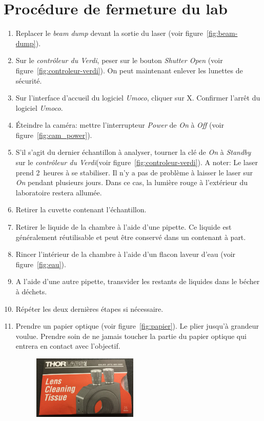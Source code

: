 \section{Procédure de fermeture du lab}


\begin{enumerate}
    \item Replacer le \textit{beam dump} devant la sortie du laser (voir figure~\ref{fig:beam-dump}).
    \item Sur le \textit{contrôleur du Verdi}, peser sur le bouton \textit{Shutter Open} (voir figure~\ref{fig:controleur-verdi}). On peut maintenant enlever les lunettes de sécurité.
    \item Sur l'interface d'accueil du logiciel \textit{Umoco}, cliquer sur X. Confirmer l'arrêt du logiciel \textit{Umoco}.
    \item Éteindre la caméra: mettre l'interrupteur \textit{Power} de \textit{On} à \textit{Off} (voir figure~\ref{fig:cam_power}).
    \item S'il s'agit du dernier échantillon à analyser, tourner la clé de \textit{On} à \textit{Standby} sur le \textit{contrôleur du Verdi}(voir figure~\ref{fig:controleur-verdi}). A noter: Le laser prend 2~heures à se stabiliser. Il n'y a pas de problème à laisser le laser sur \textit{On} pendant plusieurs jours. Dans ce cas, la lumière rouge à l'extérieur du laboratoire restera allumée.
    \item Retirer la cuvette contenant l'échantillon.
    \item Retirer le liquide de la chambre à l'aide d'une pipette. Ce liquide est généralement réutilisable et peut être conservé dans un contenant à part.
    \item Rincer l'intérieur de la chambre à l'aide d'un flacon laveur d'eau (voir figure~\ref{fig:eau}).
    \item A l'aide d'une autre pipette, transvider les restants de liquides dans le bécher à déchets.
    \item Répéter les deux dernières étapes si nécessaire.
    \item Prendre un papier optique (voir figure~\ref{fig:papier}). Le plier jusqu'à grandeur voulue. Prendre soin de ne jamais toucher la partie du papier optique qui entrera en contact avec l'objectif. 
        \begin{figure}[H]
        \centering
        \includegraphics[width=5cm]{papier.jpg}

\end{figure}
\end{enumerate}
